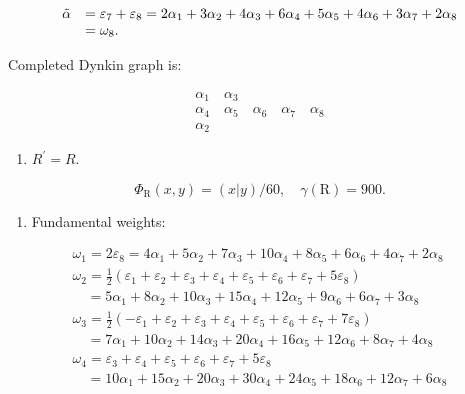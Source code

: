 \[
\begin{array}{r l} \tilde {\alpha} & = \varepsilon_ {7} + \varepsilon_ {8} = 2 \alpha_ {1} + 3 \alpha_ {2} + 4 \alpha_ {3} + 6 \alpha_ {4} + 5 \alpha_ {5} + 4 \alpha_ {6} + 3 \alpha_ {7} + 2 \alpha_ {8} \\ & = \omega_ {8}. \end{array}
\]

Completed Dynkin graph is:

\[
\begin{array}{c} \alpha_ {1} \quad \alpha_ {3} \\ \alpha_ {4} \quad \alpha_ {5} \quad \alpha_ {6} \quad \alpha_ {7} \quad \alpha_ {8} \\ \alpha_ {2} \end{array}
\]

\begin{enumerate}
\def\labelenumi{(\Alph{enumi})}
\setcounter{enumi}{21}
\tightlist
\item
  \(R^{\prime} = R.\)
\end{enumerate}

\[
  \Phi_ {\mathrm{R}} (x, y) = (x | y) / 60, \quad \gamma (\mathrm{R}) = 900.
\]

\begin{enumerate}
\def\labelenumi{(\Roman{enumi})}
\setcounter{enumi}{5}
\tightlist
\item
  Fundamental weights:
\end{enumerate}

\[
\begin{array}{l} \omega_ {1} = 2 \varepsilon_ {8} = 4 \alpha_ {1} + 5 \alpha_ {2} + 7 \alpha_ {3} + 10 \alpha_ {4} + 8 \alpha_ {5} + 6 \alpha_ {6} + 4 \alpha_ {7} + 2 \alpha_ {8} \\ \omega_ {2} = \frac {1}{2} (\varepsilon_ {1} + \varepsilon_ {2} + \varepsilon_ {3} + \varepsilon_ {4} + \varepsilon_ {5} + \varepsilon_ {6} + \varepsilon_ {7} + 5 \varepsilon_ {8}) \\ \quad = 5 \alpha_ {1} + 8 \alpha_ {2} + 10 \alpha_ {3} + 15 \alpha_ {4} + 12 \alpha_ {5} + 9 \alpha_ {6} + 6 \alpha_ {7} + 3 \alpha_ {8} \\ \omega_ {3} = \frac {1}{2} (- \varepsilon_ {1} + \varepsilon_ {2} + \varepsilon_ {3} + \varepsilon_ {4} + \varepsilon_ {5} + \varepsilon_ {6} + \varepsilon_ {7} + 7 \varepsilon_ {8}) \\ \quad = 7 \alpha_ {1} + 10 \alpha_ {2} + 14 \alpha_ {3} + 20 \alpha_ {4} + 16 \alpha_ {5} + 12 \alpha_ {6} + 8 \alpha_ {7} + 4 \alpha_ {8} \\ \omega_ {4} = \varepsilon_ {3} + \varepsilon_ {4} + \varepsilon_ {5} + \varepsilon_ {6} + \varepsilon_ {7} + 5 \varepsilon_ {8} \\ \quad = 10 \alpha_ {1} + 15 \alpha_ {2} + 20 \alpha_ {3} + 30 \alpha_ {4} + 24 \alpha_ {5} + 18 \alpha_ {6} + 12 \alpha_ {7} + 6 \alpha_ {8} \end{array}
\]

